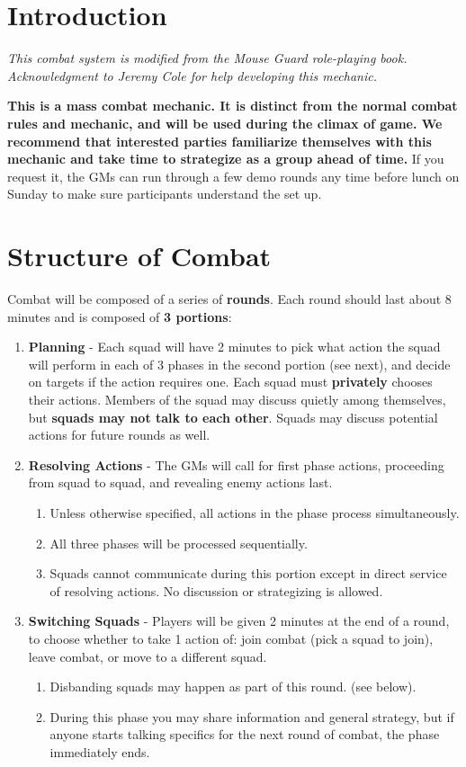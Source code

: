 \documentclass[green]{gl2018}
\begin{document}
\name{\gBattleStrategy{}}

\section*{Introduction}
\emph{This combat system is modified from the Mouse Guard role-playing book. Acknowledgment to Jeremy Cole for help developing this mechanic.}

{\bf This is a mass combat mechanic. It is distinct from the normal combat rules and mechanic, and will be used during the climax of game. We recommend that interested parties familiarize themselves with this mechanic and take time to strategize as a group ahead of time.} If you request it, the GMs can run through a few demo rounds any time before lunch on Sunday to make sure participants understand the set up.

\section*{Structure of Combat}

Combat will be composed of a series of {\bf rounds}. Each round should last about 8 minutes and is composed of {\bf 3 portions}:
\begin{enumerate}
	\item {\bf Planning} - Each squad will have 2 minutes to pick what action the squad will perform in each of 3 phases in the second portion (see next), and decide on targets if the action requires one. Each squad must {\bf privately} chooses their actions. Members of the squad may discuss quietly among themselves, but {\bf squads may not talk to each other}. Squads may discuss potential actions for future rounds as well.
	\item {\bf Resolving Actions} - The GMs will call for first phase actions, proceeding from squad to squad, and revealing enemy actions last. 
	\begin{enumerate}
		\item Unless otherwise specified, all actions in the phase process simultaneously.
		\item All three phases will be processed sequentially.
		\item Squads cannot communicate during this portion except in direct service of resolving actions. No discussion or strategizing is allowed.
	\end{enumerate}
	\item {\bf Switching Squads} - Players will be given 2 minutes at the end of a round, to choose whether to take 1 action of: join combat (pick a squad to join), leave combat, or move to a different squad. 
	\begin{enumerate}
		\item Disbanding squads may happen as part of this round. (see below).
		\item During this phase you may share information and general strategy, but if anyone starts talking specifics for the next round of combat, the phase immediately ends.
	\end{enumerate}
\end{enumerate}
\end{document}
